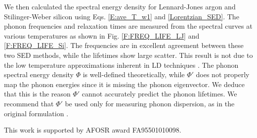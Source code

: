 \documentclass[twocolumn,10pt]{asme2e}
\begin{document}
We then calculated the spectral energy density for Lennard-Jones argon and Stilinger-Weber silicon using Eqs$.$ \eqref{E:ave_T_w1} and \eqref{Lorentzian_SED}. The phonon frequencies and
relaxation times are measured from the spectral curves at various temperatures as shown in Fig$.$ \ref{F:FREQ_LIFE_LJ} and \ref{F:FREQ_LIFE_Si}. The
frequencies are in excellent agreement between these two SED methods, while the lifetimes show large scatter. This result is not due to the low temperature approximations inherent in LD techniques
\cite{turney2009a}. The phonon spectral energy density $\Phi$ is well-defined theoretically,\cite{dove1993,wallace1972} while $\Phi'$ does not properly map the phonon energies since it is missing the phonon eigenvector. We deduce that this is the reason $\Phi'$ cannot accurately predict the phonon lifetimes. We recommend that $\Phi'$ be used only for measuring phonon dispersion, as in the original formulation \cite{marayuma2003}.

\begin{acknowledgment}
This work is supported by AFOSR award FA95501010098.
\end{acknowledgment}





\end{document}
